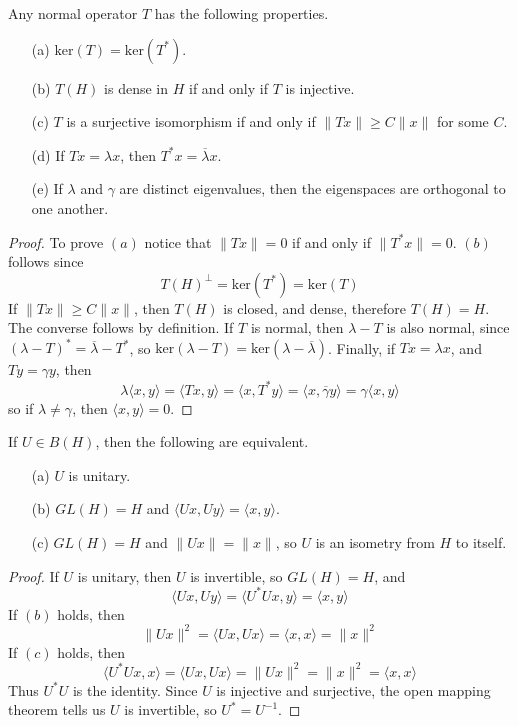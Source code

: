 \begin{theorem}
    Any normal operator $T$ has the following properties.
    \begin{enumerate}
        \item[(a)] $\text{ker}(T) = \text{ker}(T^*)$.
        \item[(b)] $T(H)$ is dense in $H$ if and only if $T$ is injective.
        \item[(c)] $T$ is a surjective isomorphism if and only if $\| Tx \| \geq C \| x \|$ for some $C$.
        \item[(d)] If $Tx = \lambda x$, then $T^*x = \overline{\lambda} x$.
        \item[(e)] If $\lambda$ and $\gamma$ are distinct eigenvalues, then the eigenspaces are orthogonal to one another.
    \end{enumerate}
\end{theorem}
\begin{proof}
    To prove $(a)$ notice that $\| Tx \| = 0$ if and only if $\| T^*x \| = 0$. $(b)$ follows since
    \[ T(H)^\perp = \text{ker}(T^*) = \text{ker}(T) \]
    If $\| Tx \| \geq C \| x \|$, then $T(H)$ is closed, and dense, therefore $T(H) = H$. The converse follows by definition. If $T$ is normal, then $\lambda - T$ is also normal, since $(\lambda - T)^* = \overline{\lambda} - T^*$, so $\text{ker}(\lambda - T) = \text{ker}(\lambda - \overline{\lambda})$. Finally, if $Tx = \lambda x$, and $Ty = \gamma y$, then
    \[ \lambda \langle x, y \rangle = \langle Tx, y \rangle = \langle x, T^*y \rangle = \langle x, \overline{\gamma} y \rangle = \gamma \langle x, y \rangle \]
    so if $\lambda \neq \gamma$, then $\langle x,y \rangle = 0$.
\end{proof}

\begin{theorem}
    If $U \in B(H)$, then the following are equivalent.
    \begin{enumerate}
        \item[(a)] $U$ is unitary.
        \item[(b)] $GL(H) = H$ and $\langle Ux, Uy \rangle = \langle x, y \rangle$.
        \item[(c)] $GL(H) = H$ and $\| Ux \| = \| x \|$, so $U$ is an isometry from $H$ to itself.
    \end{enumerate}
\end{theorem}
\begin{proof}
    If $U$ is unitary, then $U$ is invertible, so $GL(H) = H$, and
    \[ \langle Ux, Uy \rangle = \langle U^*Ux, y \rangle = \langle x, y \rangle \]
    If $(b)$ holds, then
    \[ \| Ux \|^2 = \langle Ux, Ux \rangle = \langle x, x \rangle = \| x \|^2 \]
    If $(c)$ holds, then
    \[ \langle U^*Ux, x \rangle = \langle Ux, Ux \rangle = \|Ux\|^2 = \|x\|^2 = \langle x, x \rangle \]
    Thus $U^*U$ is the identity. Since $U$ is injective and surjective, the open mapping theorem tells us $U$ is invertible, so $U^* = U^{-1}$.
\end{proof}

